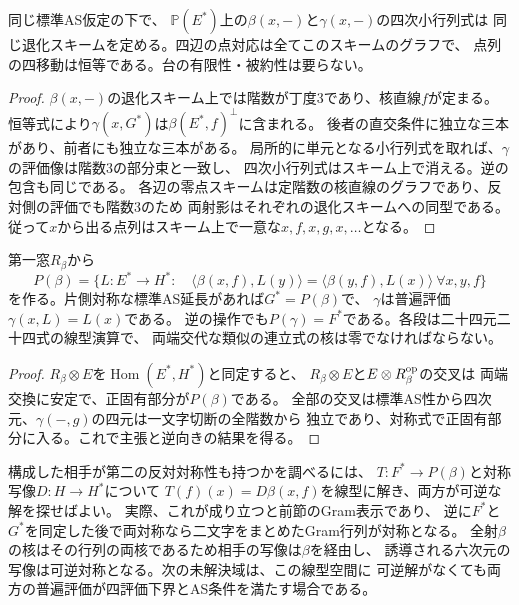 \begin{corollary}[同じ点スキームと恒等四移動]\label{cor:single-opposite-common-points}
同じ標準AS仮定の下で、
$\mathbb P(E^*)$上の$\beta(x,-)$と$\gamma(x,-)$の四次小行列式は
同じ退化スキームを定める。四辺の点対応は全てこのスキームのグラフで、
点列の四移動は恒等である。台の有限性・被約性は要らない。
\end{corollary}
\begin{proof}
$\beta(x,-)$の退化スキーム上では階数が丁度3であり、核直線$f$が定まる。
恒等式により$\gamma(x,G^*)$は$\beta(E^*,f)^\perp$に含まれる。
後者の直交条件に独立な三本があり、前者にも独立な三本がある。
局所的に単元となる小行列式を取れば、$\gamma$の評価像は階数3の部分束と一致し、
四次小行列式はスキーム上で消える。逆の包含も同じである。
各辺の零点スキームは定階数の核直線のグラフであり、反対側の評価でも階数3のため
両射影はそれぞれの退化スキームへの同型である。
従って$x$から出る点列はスキーム上で一意な$x,f,x,g,x,\ldots$となる。
\end{proof}

\begin{proposition}[片側対称の相手窓の決定]\label{prop:single-opposite-prolongation}
第一窓$R_\beta$から
\[
 P(\beta)=\{L:E^*\to H^*:\quad
 \langle\beta(x,f),L(y)\rangle=\langle\beta(y,f),L(x)\rangle\ \forall x,y,f\}
\]
を作る。片側対称な標準AS延長があれば$G^*=P(\beta)$で、
$\gamma$は普遍評価$\gamma(x,L)=L(x)$である。
逆の操作でも$P(\gamma)=F^*$である。各段は二十四元二十四式の線型演算で、
両端交代な類似の連立式の核は零でなければならない。
\end{proposition}
\begin{proof}
$R_\beta\otimes E$を$\operatorname{Hom}(E^*,H^*)$と同定すると、
$R_\beta\otimes E$と$E\otimes R_\beta^{\rm op}$の交叉は
両端交換に安定で、正固有部分が$P(\beta)$である。
全部の交叉は標準AS性から四次元、$\gamma(-,g)$の四元は一文字切断の全階数から
独立であり、対称式で正固有部分に入る。これで主張と逆向きの結果を得る。
\end{proof}

構成した相手が第二の反対対称性も持つかを調べるには、
$T:F^*\to P(\beta)$と対称写像$D:H\to H^*$について
$T(f)(x)=D\beta(x,f)$を線型に解き、両方が可逆な解を探せばよい。
実際、これが成り立つと前節のGram表示であり、
逆に$F^*$と$G^*$を同定した後で両対称なら二文字をまとめたGram行列が対称となる。
全射$\beta$の核はその行列の両核であるため相手の写像は$\beta$を経由し、
誘導される六次元の写像は可逆対称となる。次の未解決域は、この線型空間に
可逆解がなくても両方の普遍評価が四評価下界とAS条件を満たす場合である。

